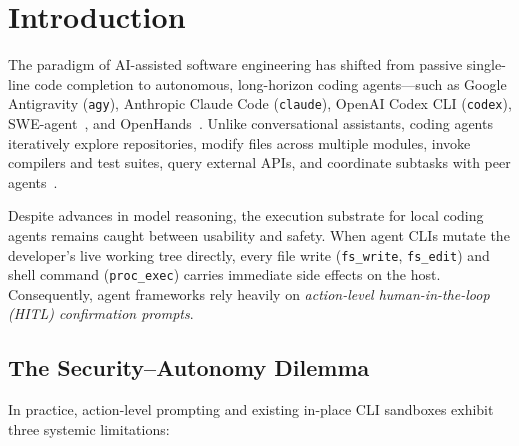 \documentclass[acmsmall,screen,review]{acmart}
\begin{document}


\maketitle
\section{Introduction}

The paradigm of AI-assisted software engineering has shifted from passive single-line code completion to autonomous, long-horizon coding agents---such as Google Antigravity (\texttt{agy}), Anthropic Claude Code (\texttt{claude}), OpenAI Codex CLI (\texttt{codex}), SWE-agent~\cite{yang2024sweagent}, and OpenHands~\cite{wang2025openhands}. Unlike conversational assistants, coding agents iteratively explore repositories, modify files across multiple modules, invoke compilers and test suites, query external APIs, and coordinate subtasks with peer agents~\cite{jimenez2024swebench,anthropic2024mcp}.

Despite advances in model reasoning, the execution substrate for local coding agents remains caught between usability and safety. When agent CLIs mutate the developer's live working tree directly, every file write (\texttt{fs\_write}, \texttt{fs\_edit}) and shell command (\texttt{proc\_exec}) carries immediate side effects on the host. Consequently, agent frameworks rely heavily on \emph{action-level human-in-the-loop (HITL) confirmation prompts}.

\subsection{The Security--Autonomy Dilemma}

In practice, action-level prompting and existing in-place CLI sandboxes exhibit three systemic limitations:
\end{document}
